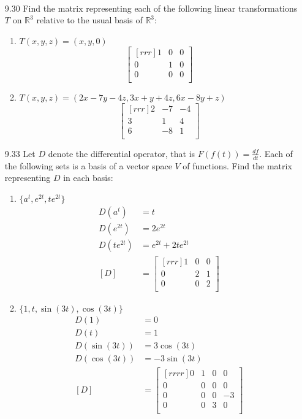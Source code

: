 \documentclass[12pt]{article}
\theoremstyle{definition}
\theoremstyle{plain}
\begin{document}
\begin{enumerate}
\begin{enumerate}
\begin{align*}
		\end{align*}
	\end{enumerate}
\item[9.30]Find the matrix representing each of the following linear transformations $T$ on $\mathbb{R}^3$ relative to the usual basis of $\mathbb{R}^3$:
	\begin{enumerate}
	\item $T(x,y,z)=(x,y,0)$
		\[ \begin{bmatrix}[rrr]1&0&0\\0&1&0\\0&0&0\\\end{bmatrix} \]
	\item $T(x,y,z)=(2x-7y-4z,3x+y+4z,6x-8y+z)$
		\[ \begin{bmatrix}[rrr]2&-7&-4\\3&1&4\\6&-8&1\\\end{bmatrix} \]
	\end{enumerate}
\item[9.33]Let $D$ denote the differential operator, that is $F(f(t))=\frac{df}{dt}$. Each of the following sets is a basis of a vector space $V$ of functions. Find the matrix representing $D$ in each basis:
	\begin{enumerate}
	\item $\{a^t,e^{2t},te^{2t}\}$
		\begin{align*}
		D(a^t)&=t\\
		D(e^{2t})&=2e^{2t}\\
		D(te^{2t})&=e^{2t}+2te^{2t}\\
		[D] &= \begin{bmatrix}[rrr]1&0&0\\0&2&1\\0&0&2\\\end{bmatrix}
		\end{align*}
	\item $\{1,t,\sin(3t),\cos(3t)\}$
		\begin{align*}
		D(1)&=0\\
		D(t)&=1\\
		D(\sin(3t))&=3\cos(3t)\\
		D(\cos(3t))&=-3\sin(3t)\\
		[D] &= \begin{bmatrix}[rrrr]0&1&0&0\\0&0&0&0\\0&0&0&-3\\0&0&3&0\\\end{bmatrix}

\end{align*}
\end{enumerate}
\end{enumerate}
\end{document}
